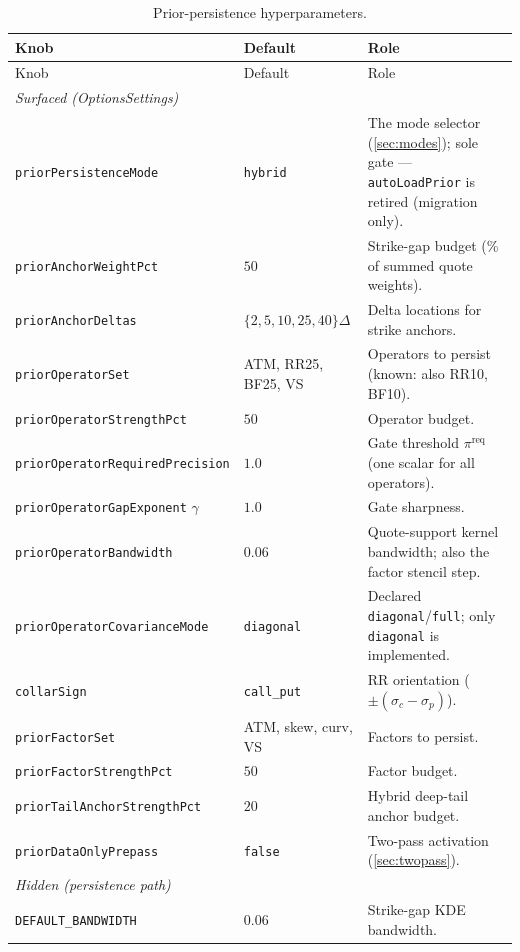 \documentclass[11pt]{article}
\begin{document}
\small
\setlength{\tabcolsep}{4pt}
\begin{longtable}{p{}p{}p{}}
\caption{Prior-persistence hyperparameters.}\label{tab:atlas}\\
\toprule Knob & Default & Role\\ \midrule
\endfirsthead \toprule Knob & Default & Role\\ \midrule \endhead
\multicolumn{3}{l}{\emph{Surfaced (OptionsSettings)}}\\ \midrule
\texttt{priorPersistenceMode} & \texttt{hybrid} & The mode selector
(\cref{sec:modes}); sole gate --- \texttt{autoLoadPrior} is retired
(migration only).\\
\texttt{priorAnchorWeightPct} & $50$ & Strike-gap budget (\% of summed quote
weights).\\
\texttt{priorAnchorDeltas} & $\{2,5,10,25,40\}\Delta$ & Delta locations for
strike anchors.\\
\texttt{priorOperatorSet} & ATM, RR25, BF25, VS & Operators to persist
(known: also RR10, BF10).\\
\texttt{priorOperatorStrengthPct} & $50$ & Operator budget.\\
\texttt{priorOperatorRequiredPrecision} & $1.0$ & Gate threshold
$\pi^{\text{req}}$ (one scalar for all operators).\\
\texttt{priorOperatorGapExponent} $\gamma$ & $1.0$ & Gate sharpness.\\
\texttt{priorOperatorBandwidth} & $0.06$ & Quote-support kernel bandwidth;
also the factor stencil step.\\
\texttt{priorOperatorCovarianceMode} & \texttt{diagonal} & Declared
\texttt{diagonal}/\texttt{full}; only \texttt{diagonal} is implemented.\\
\texttt{collarSign} & \texttt{call\_put} & RR orientation
($\pm(\sigma_c-\sigma_p)$).\\
\texttt{priorFactorSet} & ATM, skew, curv, VS & Factors to persist.\\
\texttt{priorFactorStrengthPct} & $50$ & Factor budget.\\
\texttt{priorTailAnchorStrengthPct} & $20$ & Hybrid deep-tail anchor budget.\\
\texttt{priorDataOnlyPrepass} & \texttt{false} & Two-pass activation
(\cref{sec:twopass}).\\
\midrule
\multicolumn{3}{l}{\emph{Hidden (persistence path)}}\\ \midrule
\texttt{DEFAULT\_BANDWIDTH} & $0.06$ & Strike-gap KDE bandwidth.\\

\end{longtable}
\end{document}
